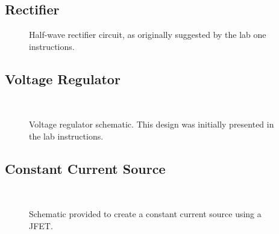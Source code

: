 \subsection{Rectifier}
\begin{figure}[H]
	\centering
	
	\parbox{3.5in}{
	\caption{Half-wave rectifier circuit, as originally suggested by the lab
	one instructions.}
	\label{fig:schem1}}
\end{figure}

\subsection{Voltage Regulator}
\begin{figure}[H]
	\centering
	\\
	\parbox{3.5in}{
	\caption{Voltage regulator schematic.  This design was initially presented
	in the lab instructions.}
	\label{fig:schem3}}
\end{figure}

\subsection{Constant Current Source}
\begin{figure}[H]
	\centering
	\\
	\parbox{3.5in}{
	\caption{Schematic provided to create a constant current source using a JFET.}
	\label{fig:schem4}}
\end{figure}
